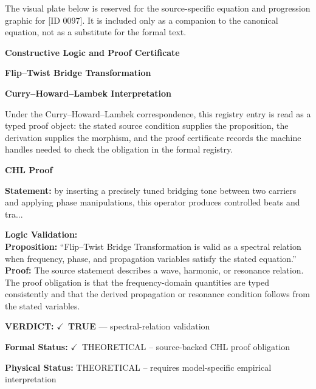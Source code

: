 \begingroup\footnotesize\sloppy
The visual plate below is reserved for the source-specific equation and progression graphic for [ID 0097]. It is included only as a companion to the canonical equation, not as a substitute for the formal text.
\par\endgroup
\ifTZPDarkEdition
{}
\fi

\clearpage
\begingroup\tzpsupportsetup
\noindent\textbf{\fontsize{10.8pt}{12.8pt}\selectfont [ID 0097] Constructive Logic and Proof Certificate}\par
\noindent\textbf{\fontsize{10pt}{12pt}\selectfont Flip--Twist Bridge Transformation}\par
\vspace{0.45em}
\begingroup
\footnotesize
\setlength{\parskip}{0.22em}
\setlength{\parindent}{0pt}
\noindent\textbf{Curry--Howard--Lambek Interpretation}\par
Under the Curry--Howard--Lambek correspondence, this registry entry is read as a typed proof
object: the stated source condition supplies the proposition, the derivation supplies the
morphism, and the proof certificate records the machine handles needed to check the obligation
in the formal registry.

\vspace{0.45em}
\noindent\textbf{CHL Proof}\par
\textbf{Statement:} by inserting a precisely tuned bridging tone between two carriers and applying phase
manipulations, this operator produces controlled beats and tra...

\textbf{Logic Validation:}\\
\textbf{Proposition:} ``Flip--Twist Bridge Transformation is valid as a spectral relation when frequency, phase,
and propagation variables satisfy the stated equation.''\\
\textbf{Proof:} The source statement describes a wave, harmonic, or resonance relation. The proof
obligation is that the frequency-domain quantities are typed consistently and that the
derived propagation or resonance condition follows from the stated variables.

\textbf{VERDICT:} \ensuremath{\checkmark}\ \textbf{TRUE} --- spectral-relation validation

\textbf{Formal Status:} \ensuremath{\checkmark}\ THEORETICAL -- source-backed CHL proof obligation

\textbf{Physical Status:} THEORETICAL -- requires model-specific empirical interpretation
\par\vspace{0.45em}
\par
\ifTZPDarkEdition
{}
\fi
\endgroup
\endgroup
